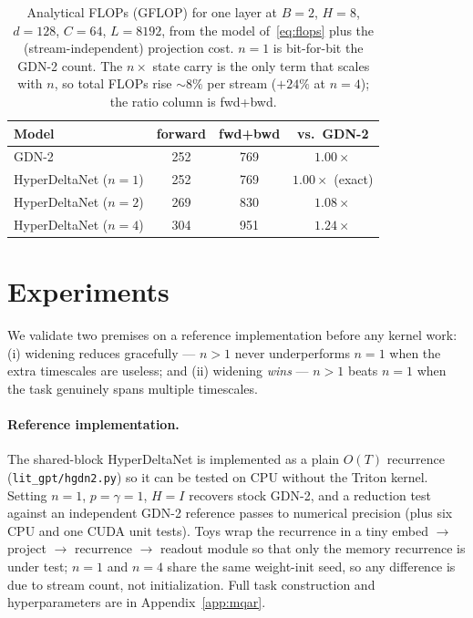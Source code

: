 \documentclass[11pt,letterpaper,logo]{yalearxiv}
\begin{document}
\begin{table}[t]
\centering
\small
\begin{tabular}{@{}lccc@{}}
\toprule
Model & forward & fwd+bwd & vs.\ GDN-2 \\
\midrule
GDN-2                       & 252 & 769 & $1.00\times$ \\
HyperDeltaNet ($n{=}1$)     & 252 & 769 & $1.00\times$ (exact) \\
HyperDeltaNet ($n{=}2$)     & 269 & 830 & $1.08\times$ \\
HyperDeltaNet ($n{=}4$)     & 304 & 951 & $1.24\times$ \\
\bottomrule
\end{tabular}
\caption{Analytical FLOPs (GFLOP) for one layer at $B{=}2$, $H{=}8$, $d{=}128$,
$C{=}64$, $L{=}8192$, from the model of~\eqref{eq:flops} plus the (stream-independent)
projection cost. $n{=}1$ is bit-for-bit the GDN-2 count. The $n\times$ state carry is
the only term that scales with $n$, so total FLOPs rise ${\sim}8\%$ per stream
($+24\%$ at $n{=}4$); the ratio column is fwd+bwd.}
\label{tab:flops}
\end{table}


\section{Experiments}
\label{sec:exp}

We validate two premises on a reference implementation before any kernel work:
(i) widening reduces gracefully --- $n>1$ never underperforms $n=1$ when the extra
timescales are useless; and (ii) widening \emph{wins} --- $n>1$ beats $n=1$ when
the task genuinely spans multiple timescales.

\paragraph{Reference implementation.} The shared-block HyperDeltaNet is
implemented as a plain $O(T)$ recurrence (\texttt{lit\_gpt/hgdn2.py}) so it can be
tested on CPU without the Triton kernel. Setting $n=1$, $p=\gamma=1$, $H=I$ recovers
stock GDN-2, and a reduction test against an independent GDN-2 reference passes to
numerical precision (plus six CPU and one CUDA unit tests). Toys wrap the
recurrence in a tiny embed $\to$ project $\to$ recurrence $\to$ readout module so
that only the memory recurrence is under test; $n=1$ and $n=4$ share the same
weight-init seed, so any difference is due to stream count, not initialization.
Full task construction and hyperparameters are in Appendix~\ref{app:mqar}.
\end{document}
